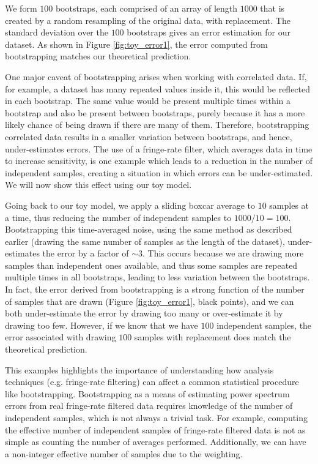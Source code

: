 \documentclass[preprint2,numberedappendix,tighten]{aastex6}  %
\begin{document}
We form $100$ bootstraps, each comprised of an array of length $1000$ that is created by a random resampling of the original data, with replacement. The standard deviation over the $100$ bootstraps gives an error estimation for our dataset. As shown in Figure \ref{fig:toy_error1}, the error computed from bootstrapping matches our theoretical prediction.

One major caveat of bootstrapping arises when working with correlated data. If, for example, a dataset has many repeated values inside it, this would be reflected in each bootstrap. The same value would be present multiple times within a bootstrap and also be present between bootstraps, purely because it has a more likely chance of being drawn if there are many of them. Therefore, bootstrapping correlated data results in a smaller variation between bootstraps, and hence, under-estimates errors. The use of a fringe-rate filter, which averages data in time to increase sensitivity, is one example which leads to a reduction in the number of independent samples, creating a situation in which errors can be under-estimated. We will now show this effect using our toy model.

Going back to our toy model, we apply a sliding boxcar average to $10$ samples at a time, thus reducing the number of independent samples to $1000/10 = 100$. Bootstrapping this time-averaged noise, using the same method as described earlier (drawing the same number of samples as the length of the dataset), under-estimates the error by a factor of $\sim3$. This occurs because we are drawing more samples than independent ones available, and thus some samples are repeated multiple times in all bootstraps, leading to less variation between the bootstraps. In fact, the error derived from bootstrapping is a strong function of the number of samples that are drawn (Figure \ref{fig:toy_error1}, black points), and we can both under-estimate the error by drawing too many or over-estimate it by drawing too few. However, if we know that we have $100$ independent samples, the error associated with drawing $100$ samples with replacement does match the theoretical prediction.

This examples highlights the importance of understanding how analysis techniques (e.g. fringe-rate filtering) can affect a common statistical procedure like bootstrapping. Bootstrapping as a means of estimating power spectrum errors from real fringe-rate filtered data requires knowledge of the number of independent samples, which is not always a trivial task. For example, computing the effective number of independent samples of fringe-rate filtered data is not as simple as counting the number of averages performed. Additionally, we can have a non-integer effective number of samples due to the weighting.
\end{document}
